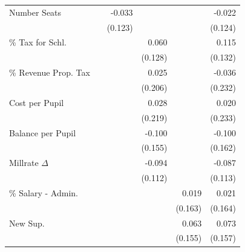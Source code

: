 \begin{scriptsize}
\begin{longtable}{ l D{.}{.}{3}D{.}{.}{3}D{.}{.}{3}D{.}{.}{3}D{.}{.}{3} }
Number Seats          &                   & -0.033            &                   &                   & -0.022           \\ 
                      &                   & (0.123)           &                   &                   & (0.124)          \\ 
\% Tax for Schl.     &                   &                   & 0.060             &                   & 0.115            \\ 
                      &                   &                   & (0.128)           &                   & (0.132)          \\ 
\% Revenue Prop. Tax &                   &                   & 0.025             &                   & -0.036           \\ 
                      &                   &                   & (0.206)           &                   & (0.232)          \\ 
Cost per Pupil        &                   &                   & 0.028             &                   & 0.020            \\ 
                      &                   &                   & (0.219)           &                   & (0.233)          \\ 
Balance per Pupil     &                   &                   & -0.100            &                   & -0.100           \\ 
                      &                   &                   & (0.155)           &                   & (0.162)          \\ 
Millrate $\Delta$    &                   &                   & -0.094            &                   & -0.087           \\ 
                      &                   &                   & (0.112)           &                   & (0.113)          \\ 
\% Salary - Admin.   &                   &                   &                   & 0.019             & 0.021            \\ 
                      &                   &                   &                   & (0.163)           & (0.164)          \\ 
New Sup.              &                   &                   &                   & 0.063             & 0.073            \\ 
                      &                   &                   &                   & (0.155)           & (0.157)          \\ 

\end{longtable}
\end{scriptsize}
